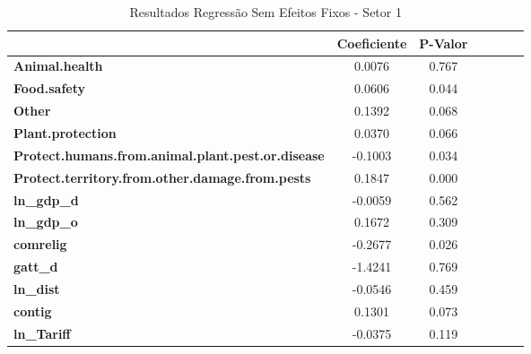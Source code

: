 \begin{table}[ht]
\begin{center}
\begin{tabular}{lcccccc}
                                                          & \textbf{Coeficiente} &\textbf{P-Valor} \\
\midrule
\textbf{Animal.health}                                    &       0.0076  &        0.767        \\
\textbf{Food.safety}                                      &       0.0606  &        0.044        \\
\textbf{Other}                                            &       0.1392  &        0.068        \\
\textbf{Plant.protection}                                 &       0.0370  &        0.066        \\
\textbf{Protect.humans.from.animal.plant.pest.or.disease} &      -0.1003  &        0.034        \\
\textbf{Protect.territory.from.other.damage.from.pests}   &       0.1847  &        0.000        \\
\textbf{ln\_gdp\_d}                                       &      -0.0059  &        0.562        \\
\textbf{ln\_gdp\_o}                                       &       0.1672  &        0.309        \\
\textbf{comrelig}                                         &      -0.2677  &        0.026        \\
\textbf{gatt\_d}                                          &      -1.4241  &        0.769        \\
\textbf{ln\_dist}                                         &      -0.0546  &        0.459        \\
\textbf{contig}                                           &       0.1301  &        0.073        \\
\textbf{ln\_Tariff}                                       &      -0.0375  &        0.119        \\
\bottomrule
\end{tabular}
\caption{Resultados Regressão Sem Efeitos Fixos - Setor 1}
\end{center}
\end{table}